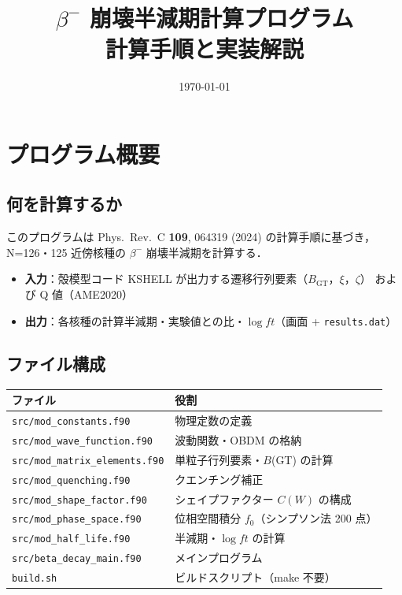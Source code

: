 \documentclass[12pt,a4paper]{ltjsarticle}
\title{\textbf{$\beta^-$ 崩壊半減期計算プログラム\\計算手順と実装解説}}
\date{\today}
\begin{document}
\maketitle
\tableofcontents
\newpage

\section{プログラム概要}

\subsection{何を計算するか}

このプログラムは Phys.\ Rev.\ C \textbf{109}, 064319 (2024) の計算手順に基づき，
N=126・125 近傍核種の $\beta^-$ 崩壊半減期を計算する．

\begin{itemize}
  \item \textbf{入力}：殻模型コード KSHELL が出力する遷移行列要素（$B_\text{GT}$，$\xi$，$\zeta$）
        および Q 値（AME2020）
  \item \textbf{出力}：各核種の計算半減期・実験値との比・$\log ft$（画面 + \texttt{results.dat}）
\end{itemize}

\subsection{ファイル構成}

\begin{center}
\begin{tabular}{ll}
\toprule
ファイル & 役割 \\
\midrule
\texttt{src/mod\_constants.f90} & 物理定数の定義 \\
\texttt{src/mod\_wave\_function.f90} & 波動関数・OBDM の格納 \\
\texttt{src/mod\_matrix\_elements.f90} & 単粒子行列要素・$B$(GT) の計算 \\
\texttt{src/mod\_quenching.f90} & クエンチング補正 \\
\texttt{src/mod\_shape\_factor.f90} & シェイプファクター $C(W)$ の構成 \\
\texttt{src/mod\_phase\_space.f90} & 位相空間積分 $f_0$（シンプソン法 200 点）\\
\texttt{src/mod\_half\_life.f90} & 半減期・$\log ft$ の計算 \\
\texttt{src/beta\_decay\_main.f90} & メインプログラム \\
\texttt{build.sh} & ビルドスクリプト（make 不要）\\
\bottomrule
\end{tabular}
\end{center}
\end{document}
